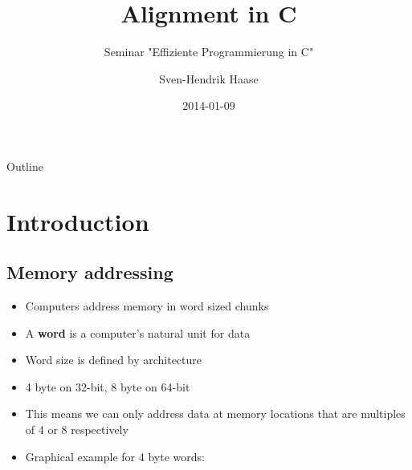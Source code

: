 \documentclass{beamer}
\begin{document}
\title{Alignment in C}
\subtitle{Seminar "Effiziente Programmierung in C"}
\date{2014-01-09}
\author{Sven-Hendrik Haase}

\begin{frame}
    \titlepage
\end{frame}

\begin{frame}{Outline}
    \tableofcontents
\end{frame}

\section{Introduction}
\subsection{Memory addressing}
\begin{frame}{\insertsection}{\insertsubsection}
	\begin{itemize}
		\item Computers address memory in word sized chunks
		\item A \textbf{word} is a computer's natural unit for data
		\item Word size is defined by architecture
		\item 4 byte on 32-bit, 8 byte on 64-bit
		\item This means we can only address data at memory locations that are
			  multiples of 4 or 8 respectively\pause\
		\item Graphical example for 4 byte words:
	\end{itemize}

	\begin{center}
	\end{center}
\end{frame}
\end{document}
